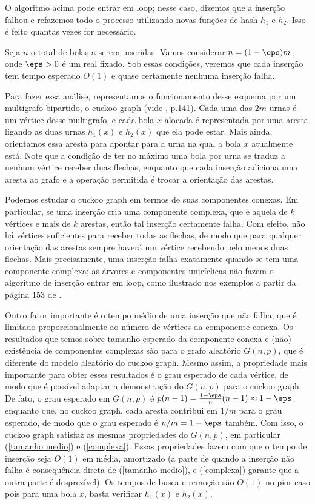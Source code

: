 O algoritmo acima pode entrar em loop; nesse caso, dizemos que a inserção falhou e refazemos todo o processo utilizando novas funções de hash $h_1$ e $h_2$. Isso é feito quantas vezes for necessário.

Seja $n$ o total de bolas a serem inseridas. Vamos considerar $n = (1-\eps)m$, onde $\eps>0$ é um real fixado. Sob essas condições, veremos que cada inserção tem tempo esperado $O(1)$ e quase certamente nenhuma inserção falha.

Para fazer essa análise, representamos o funcionamento desse esquema por um multigrafo bipartido, o cuckoo graph (vide \cite{1}, p.141). Cada uma das $2m$ urnas é um vértice desse multigrafo, e cada bola $x$ alocada é representada por uma aresta ligando as duas urnas $h_1(x)$ e $h_2(x)$ que ela pode estar. Mais ainda, orientamos essa aresta para apontar para a urna na qual a bola $x$ atualmente está. Note que a condição de ter no máximo uma bola por urna se traduz a nenhum vértice receber duas flechas, enquanto que cada inserção adiciona uma aresta ao grafo e a operação permitida é trocar a orientação das arestas.

Podemos estudar o cuckoo graph em termos de suas componentes conexas. Em particular, se uma inserção cria uma componente complexa, que é aquela de $k$ vértices e mais de $k$ arestas, então tal inserção certamente falha. Com efeito, não há vértices suficientes para receber todas as flechas, de modo que para qualquer orientação das arestas sempre haverá um vértice recebendo pelo menos duas flechas. Mais precisamente, uma inserção falha exatamente quando se tem uma componente complexa; as árvores e componentes unicíclicas não fazem o algoritmo de inserção entrar em loop, como ilustrado nos exemplos a partir da página 153 de \cite{1}.

Outro fator importante é o tempo médio de uma inserção que não falha, que é limitado proporcionalmente ao número de vértices da componente conexa. Os resultados que temos sobre tamanho esperado da componente conexa e (não) existência de componentes complexas são para o grafo aleatório $G(n,p)$, que é diferente do modelo aleatório do cuckoo graph. Mesmo assim, a propriedade mais importante para obter esses resultados é o grau esperado de cada vértice, de modo que é possível adaptar a demonstração do $G(n,p)$ para o cuckoo graph. De fato, o grau esperado em $G(n,p)$ é $p(n-1) = \frac{1-\eps}{n}(n-1) \approx 1-\eps$, enquanto que, no cuckoo graph, cada aresta contribui em $1/m$ para o grau esperado, de modo que o grau esperado é $n/m = 1-\eps$ também. Com isso, o cuckoo graph satisfaz as mesmas propriedades do $G(n,p)$, em particular (\ref{tamanho medio}) e (\ref{complexa}). Essas propriedades fazem com que o tempo de inserção seja $O(1)$ em média, amortizado (a parte de quando a inserção não falha é consequência direta de (\ref{tamanho medio}), e (\ref{complexa}) garante que a outra parte é desprezível). Os tempos de busca e remoção são $O(1)$ no pior caso pois para uma bola $x$, basta verificar $h_1(x)$ e $h_2(x)$.














